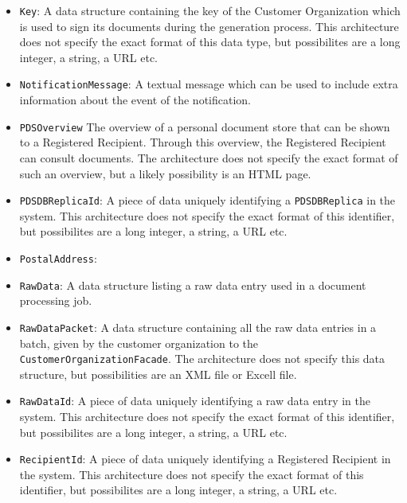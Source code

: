 \documentclass[a4paper,10pt]{article}
\begin{document}
\begin{itemize}
    \item \texttt{Key}: A data structure containing the key of the Customer Organization which is used to sign its documents during the generation process. This architecture does not specify the exact format of this data type, but possibilites are a long integer, a string, a URL etc.
    
    \item \texttt{NotificationMessage}: A textual message which can be used to include extra information about the event of the notification.
    
	\item \texttt{PDSOverview} The overview of a personal document store that can be shown to a Registered Recipient. Through this overview, the Registered Recipient can consult documents. The architecture does not specify the exact format of such an overview, but a likely possibility is an HTML page.
    
    \item \texttt{PDSDBReplicaId}:  A piece of data uniquely identifying a \texttt{PDSDBReplica} in the system. This architecture does not specify the exact format of this identifier, but possibilites are a long integer, a string, a URL etc.
    
	\item \texttt{PostalAddress}:    
    
    \item \texttt{RawData}: A data structure listing a raw data entry used in a document processing job.
    
    \item \texttt{RawDataPacket}: A data structure containing all the raw data entries in a batch, given by the customer organization to the \texttt{CustomerOrganizationFacade}. The architecture does not specify this data structure, but possibilities are an XML file or Excell file.
    
    \item \texttt{RawDataId}: A piece of data uniquely identifying a raw data entry in the system. This architecture does not specify the exact format of this identifier, but possibilites are a long integer, a string, a URL etc.
    
    \item \texttt{RecipientId}: A piece of data uniquely identifying a Registered Recipient in the system. This architecture does not specify the exact format of this identifier, but possibilites are a long integer, a string, a URL etc.
    

\end{itemize}
\end{document}
